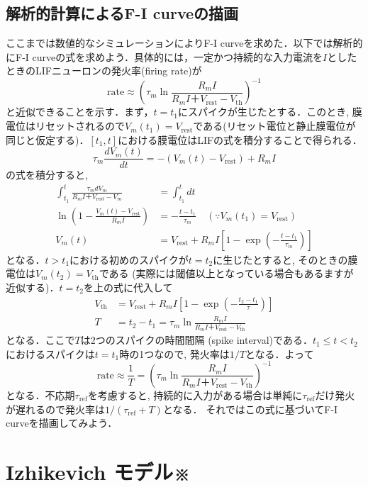 \subsection{解析的計算によるF-I curveの描画}
ここまでは数値的なシミュレーションによりF-I curveを求めた．以下では解析的にF-I curveの式を求めよう．具体的には，一定かつ持続的な入力電流を$I$としたときのLIFニューロンの発火率(firing rate)が
\begin{equation}
\text{rate}\approx \left(\tau_m \ln \frac{R_mI}{R_mI＋V_\text{rest}-V_{\text{th}}}\right)^{-1}
\end{equation}
と近似できることを示す．まず，$t=t_1$にスパイクが生じたとする．このとき, 膜電位はリセットされるので$V_m(t_1)=V_\text{rest}$である(リセット電位と静止膜電位が同じと仮定する)．$[t_1, t]$における膜電位はLIFの式を積分することで得られる．
\begin{equation}
\tau_m \frac{dV_{m}(t)}{dt}=-(V_{m}(t)-V_\text{rest})+R_m I
\end{equation}
の式を積分すると, 
\begin{align}
\int_{t_1}^{t} \frac{\tau_m dV_m}{R_mI＋V_\text{rest}-V_m}&=\int_{t_1}^{t} dt\\
\ln \left(1-\frac{V_m(t)-V_\text{rest}}{R_mI}\right)&=-\frac{t-t_1}{\tau_m} \quad (\because V_m(t_1)=V_\text{rest})\\
V_m(t) &=V_\text{rest} + R_mI\left[1-\exp\left(-\frac{t-t_1}{\tau_m}\right)\right] 
\end{align}
となる．$t>t_1$における初めのスパイクが$t=t_2$に生じたとすると, そのときの膜電位は$V_m(t_2)=V_{\text{th}}$である (実際には閾値以上となっている場合もあるますが近似する)．$t=t_2$を上の式に代入して
\begin{align}
V_{\text{th}}&=V_\text{rest} + R_mI\left[1-\exp\left(-\frac{t_2-t_1}{\tau}\right)\right] \\
T&= t_2-t_1 = \tau_m \ln \frac{R_mI}{R_mI＋V_\text{rest}-V_{\text{th}}}
\end{align}
となる．ここで$T$は2つのスパイクの時間間隔 (spike interval)である．$t_1\leq t<t_2$におけるスパイクは$t=t_1$時の1つなので, 発火率は$1/T$となる．よって
\begin{equation}
\text{rate}\approx \frac{1}{T}=\left(\tau_m \ln \frac{R_mI}{R_mI＋V_\text{rest}-V_{\text{th}}}\right)^{-1}
\end{equation}
となる．不応期$\tau_{\text{ref}}$を考慮すると, 持続的に入力がある場合は単純に$\tau_{\text{ref}}$だけ発火が遅れるので発火率は$1/(\tau_{\text{ref}}+T)$となる．
それではこの式に基づいてF-I curveを描画してみよう．
\section{Izhikevich モデル※}

